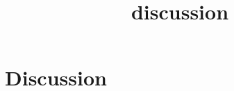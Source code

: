 \documentclass{article}
\title{discussion}
\begin{document}
\maketitle

\section{Discussion}
\end{document}
